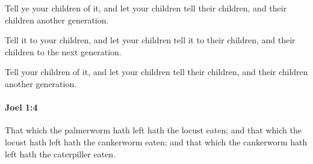 			\begin{versebox}
					\item[BHS] 
					\item[LXX] 
					\item[ASV] Tell ye your children of it, and let your children tell their children, and their children another generation.
					\item[NIV] Tell it to your children, and let your children tell it to their children, and their children to the next generation.
					\item[NRSV] Tell your children of it, and let your children tell their children, and their children another generation.
			\end{versebox}

		\paragraph{Joel 1:4} %
			\label{JOEL-1-4}

			That which the palmerworm hath left hath the locust eaten; and that which the locust hath left hath the cankerworm eaten; and that which the cankerworm hath left hath the caterpiller eaten.

